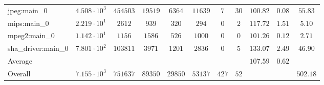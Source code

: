 \begin{tabular}{|l|c|c|c|c|c|c|c|c|c|c|}
jpeg:main\_0            & $ 4.508 \cdot 10^{3}  $ & $ 454503 $ & $ 19519 $ & $ 6364  $ & $ 11639 $ & $ 7   $ & $ 30 $ & $ 100.82      $ & $ 0.08    $ & $ 55.83   $ \\
mips:main\_0            & $ 2.219 \cdot 10^{1}  $ & $ 2612   $ & $ 939   $ & $ 320   $ & $ 294   $ & $ 0   $ & $ 2  $ & $ 117.72      $ & $ 1.51    $ & $ 5.10    $ \\
mpeg2:main\_0           & $ 1.142 \cdot 10^{1}  $ & $ 1156   $ & $ 1586  $ & $ 526   $ & $ 1000  $ & $ 0   $ & $ 0  $ & $ 101.26      $ & $ 0.12    $ & $ 2.71    $ \\
sha\_driver:main\_0     & $ 7.801 \cdot 10^{2}  $ & $ 103811 $ & $ 3971  $ & $ 1201  $ & $ 2836  $ & $ 0   $ & $ 5  $ & $ 133.07      $ & $ 2.49    $ & $ 46.90   $ \\
\hline
Average                 & $                     $ & $        $ & $       $ & $       $ & $       $ & $     $ & $    $ & $ 107.59      $ & $ 0.62    $ & $         $ \\
\hline
Overall                 & $ 7.155 \cdot 10^{3}  $ & $ 751637 $ & $ 89350 $ & $ 29850 $ & $ 53137 $ & $ 427 $ & $ 52 $ & $             $ & $         $ & $ 502.18  $ \\
\hline
\end{tabular}
